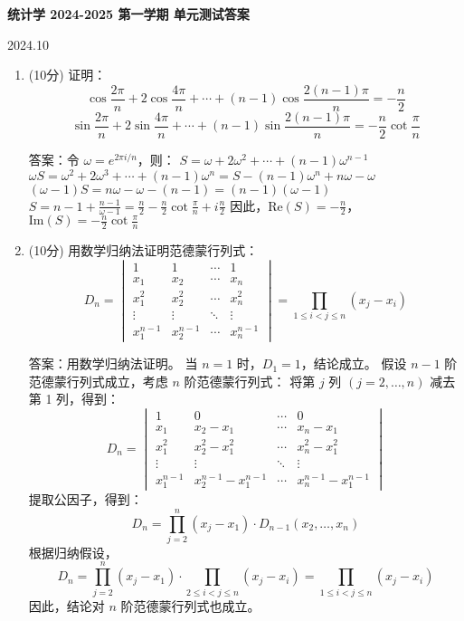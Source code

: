 \documentclass[a4paper,12pt]{article}
\begin{document}
\begin{center}
\Large\textbf{统计学 2024-2025 第一学期 单元测试答案}

\vspace{0.5cm}
\normalsize 2024.10
\end{center}

\vspace{0.5cm}

\begin{enumerate}[leftmargin=*]

    \item (10分) 证明：
    \[
    \cos\frac{2\pi}{n} + 2\cos\frac{4\pi}{n} + \cdots + (n-1)\cos\frac{2(n-1)\pi}{n} = -\frac{n}{2}
    \]
    \[
    \sin\frac{2\pi}{n} + 2\sin\frac{4\pi}{n} + \cdots + (n-1)\sin\frac{2(n-1)\pi}{n} = -\frac{n}{2}\cot\frac{\pi}{n}
    \]
    
    答案：令 $\omega = e^{2\pi i/n}$，则：
    $S = \omega + 2\omega^2 + \cdots + (n-1)\omega^{n-1}$
    $\omega S = \omega^2 + 2\omega^3 + \cdots + (n-1)\omega^n = S - (n-1)\omega^n + n\omega - \omega$
    $(\omega - 1)S = n\omega - \omega - (n-1) = (n-1)(\omega - 1)$
    $S = n-1 + \frac{n-1}{\omega-1} = \frac{n}{2} - \frac{n}{2}\cot\frac{\pi}{n} + i\frac{n}{2}$
    因此，$\text{Re}(S) = -\frac{n}{2}$，$\text{Im}(S) = -\frac{n}{2}\cot\frac{\pi}{n}$
    
    \item (10分) 用数学归纳法证明范德蒙行列式：
    \[
    D_n = \begin{vmatrix}
    1 & 1 & \cdots & 1 \\
    x_1 & x_2 & \cdots & x_n \\
    x_1^2 & x_2^2 & \cdots & x_n^2 \\
    \vdots & \vdots & \ddots & \vdots \\
    x_1^{n-1} & x_2^{n-1} & \cdots & x_n^{n-1}
    \end{vmatrix} = \prod_{1\leq i < j \leq n}(x_j - x_i)
    \]
    
    答案：用数学归纳法证明。
    当 $n=1$ 时，$D_1 = 1$，结论成立。
    假设 $n-1$ 阶范德蒙行列式成立，考虑 $n$ 阶范德蒙行列式：
    将第 $j$ 列 $(j=2,\ldots,n)$ 减去第 1 列，得到：
    \[
    D_n = \begin{vmatrix}
    1 & 0 & \cdots & 0 \\
    x_1 & x_2-x_1 & \cdots & x_n-x_1 \\
    x_1^2 & x_2^2-x_1^2 & \cdots & x_n^2-x_1^2 \\
    \vdots & \vdots & \ddots & \vdots \\
    x_1^{n-1} & x_2^{n-1}-x_1^{n-1} & \cdots & x_n^{n-1}-x_1^{n-1}
    \end{vmatrix}
    \]
    提取公因子，得到：
    \[
    D_n = \prod_{j=2}^n (x_j-x_1) \cdot D_{n-1}(x_2,\ldots,x_n)
    \]
    根据归纳假设，
    \[
    D_n = \prod_{j=2}^n (x_j-x_1) \cdot \prod_{2\leq i < j \leq n}(x_j - x_i) = \prod_{1\leq i < j \leq n}(x_j - x_i)
    \]
    因此，结论对 $n$ 阶范德蒙行列式也成立。
    

\end{enumerate}
\end{document}
